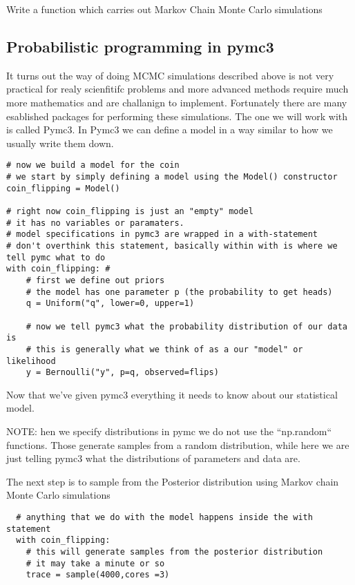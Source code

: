 \begin{example}
\begin{example}
  Write a function which carries out Markov Chain Monte Carlo simulations
\end{example}


\subsection{Probabilistic programming in pymc3}

It turns out the way of doing MCMC simulations described above is not very practical for realy scienfitifc problems and more advanced methods require much more mathematics and are challanign to implement. Fortunately there are many esablished packages for performing these simulations. The one we will work with is called Pymc3. In Pymc3 we can define a model in a way similar to how we usually write them down.

\begin{Verbatim}
# now we build a model for the coin
# we start by simply defining a model using the Model() constructor
coin_flipping = Model()

# right now coin_flipping is just an "empty" model
# it has no variables or paramaters.
# model specifications in pymc3 are wrapped in a with-statement
# don't overthink this statement, basically within with is where we tell pymc what to do
with coin_flipping: #
    # first we define out priors
    # the model has one parameter p (the probability to get heads)
    q = Uniform("q", lower=0, upper=1)

    # now we tell pymc3 what the probability distribution of our data is
    # this is generally what we think of as a our "model" or likelihood
    y = Bernoulli("y", p=q, observed=flips)
\end{Verbatim}

Now that we've given pymc3 everything it needs to know about our statistical model.

NOTE: hen we specify distributions in pymc we do not use the ``np.random`` functions. Those generate samples from a random distribution, while here we are just telling pymc3 what the distributions of parameters and data are.


The next step is to sample from the Posterior distribution using Markov chain Monte Carlo simulations

\begin{Verbatim}
  # anything that we do with the model happens inside the with statement
  with coin_flipping:
    # this will generate samples from the posterior distribution
    # it may take a minute or so
    trace = sample(4000,cores =3)
\end{Verbatim}



\end{example}
